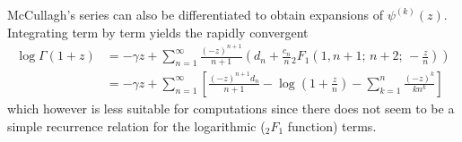 \documentclass[reqno]{amsart}
\newcommand{\CC}{\mathbb{C}}
\newtheorem{theorem}{Theorem}[section]
\theoremstyle{definition}
\begin{document}
McCullagh's series can also be differentiated to obtain
expansions of $\psi^{(k)}(z)$.
Integrating term by term yields the rapidly convergent
\begin{align}
\log \Gamma(1+z) & = -\gamma z + \sum_{n=1}^{\infty} \frac{(-z)^{n+1}}{n+1} \left( d_n + \frac{c_n}{n} {}_2F_1\!\left(1, n+1; \, n+2; \, -\frac{z}{n}\right)\right) \\
                 & = -\gamma z + \sum_{n=1}^{\infty} \left[ \frac{(-z)^{n+1} d_n}{n+1} - \log\left(1+\frac{z}{n}\right) - \sum_{k=1}^{n} \frac{(-z)^k}{k n^k} \right]
\end{align}
which however is less suitable for computations since there does not seem to
be a simple recurrence relation for the logarithmic (${}_2F_1$ function) terms.








\end{document}
